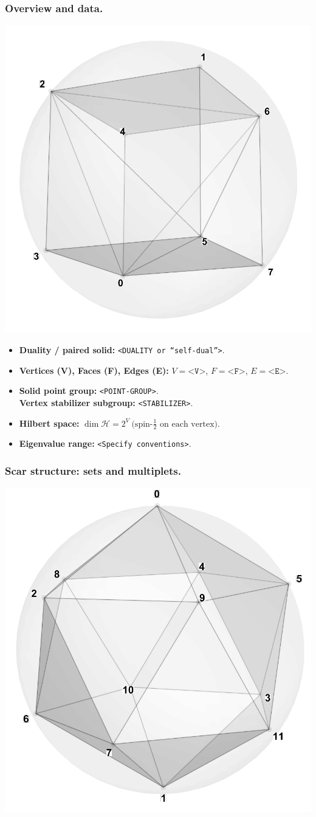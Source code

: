 \documentclass[11pt,a4paper]{article}
\begin{document}
\subsubsection*{Overview and data.}
\begin{center}
  \includegraphics[width=.6\linewidth]{triakistetrahedron}
\end{center}

\begin{itemize}[leftmargin=1.5em]
  \item \textbf{Duality / paired solid:} \texttt{<DUALITY or “self-dual”>}.
  \item \textbf{Vertices (V), Faces (F), Edges (E):} $V=\texttt{<V>}$,\; $F=\texttt{<F>}$,\; $E=\texttt{<E>}$.
  \item \textbf{Solid point group:} \texttt{<POINT-GROUP>}.\\
        \textbf{Vertex stabilizer subgroup:} \texttt{<STABILIZER>}.
  \item \textbf{Hilbert space:} \(
        \dim\mathcal{H} = 2^{V}\ \text{(spin-$\tfrac12$ on each vertex).}
        \)
  \item \textbf{Eigenvalue range:} \texttt{<Specify conventions>}.
\end{itemize}

\subsubsection*{Scar structure: sets and multiplets.}
\begin{center}
  \includegraphics[width=.6\linewidth]{icosahedron}
\end{center}
\end{document}
